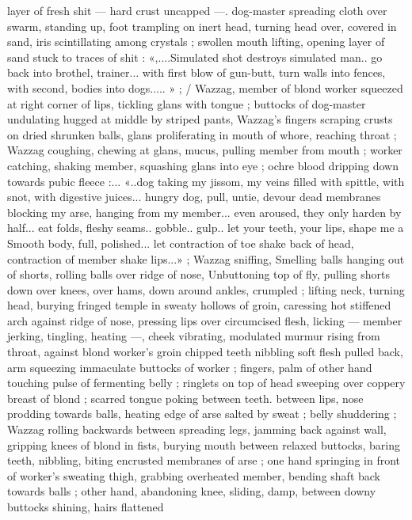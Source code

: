 layer of fresh shit --- hard crust uncapped ---. dog-master spreading
cloth over swarm, standing up, foot trampling on inert head, turning
head over, covered in sand, iris scintillating among crystals ; swollen
mouth lifting, opening layer of sand stuck to traces of shit :
«,....Simulated shot destroys simulated man.. go back into brothel,
trainer... with first blow of gun-butt, turn walls into fences, with
second, bodies into dogs..... » ; / Wazzag, member of blond worker
squeezed at right corner of lips, tickling glans with tongue ; buttocks
of dog-master undulating hugged at middle by striped pants,
Wazzag's fingers scraping crusts on dried shrunken balls, glans
proliferating in mouth of whore, reaching throat ; Wazzag coughing,
chewing at glans, mucus, pulling member from mouth ; worker
catching, shaking member, squashing glans into eye ; ochre blood
dripping down towards pubic fleece :... «..dog taking my jissom, my
veins filled with spittle, with snot, with digestive juices... hungry dog,
pull, untie, devour dead membranes blocking my arse, hanging from
my member... even aroused, they only harden by half... eat folds,
fleshy seams.. gobble.. gulp.. let your teeth, your lips, shape me a
Smooth body, full, polished... let contraction of toe shake back of
head, contraction of member shake lips...» ; Wazzag sniffing,
Smelling balls hanging out of shorts, rolling balls over ridge of nose,
Unbuttoning top of fly, pulling shorts down over knees, over hams,
down around ankles, crumpled ; lifting neck, turning head, burying
fringed temple in sweaty hollows of groin, caressing hot stiffened
arch against ridge of nose, pressing lips over circumcised flesh,
licking --- member jerking, tingling, heating ---, cheek vibrating,
modulated murmur rising from throat, against blond worker's groin
chipped teeth nibbling soft flesh pulled back, arm squeezing
immaculate buttocks of worker ; fingers, palm of other hand touching
pulse of fermenting belly ; ringlets on top of head sweeping over
coppery breast of blond ; scarred tongue poking between teeth.
between lips, nose prodding towards balls, heating edge of arse
salted by sweat ; belly shuddering ; Wazzag rolling backwards
between spreading legs, jamming back against wall, gripping knees
of blond in fists, burying mouth between relaxed buttocks, baring
teeth, nibbling, biting encrusted membranes of arse ; one hand
springing in front of worker's sweating thigh, grabbing overheated
member, bending shaft back towards balls ; other hand, abandoning
knee, sliding, damp, between downy buttocks shining, hairs flattened
